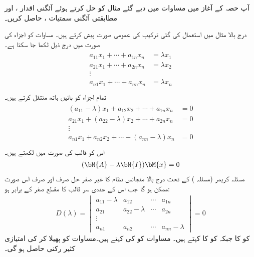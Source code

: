 آپ حصہ  کے آغاز میں مساوات  میں دیے گئے مثال کو حل کرتے ہوئے  آئگنی اقدار ،  اور  مطابقتی آئگنی سمتیات ،  حاصل کریں۔

درج بالا مثال میں استعمال کی گئی ترکیب کی عمومی صورت پیش کرتے ہیں۔ مساوات  کو اجزاء کی صورت میں درج ذیل لکھا جا سکتا ہے۔
\begin{gather}
\begin{aligned}\label{مساوات_آئگنی_متجانس_نظام_الف}
a_{11}x_1+\cdots +a_{1n}x_n&=\lambda x_1\\
a_{21}x_1+\cdots +a_{2n}x_n&=\lambda x_2\\
\vdots&\\
a_{n1}x_1+\cdots +a_{nn}x_n&=\lambda x_n\\
\end{aligned}
\end{gather}
تمام اجزاء کو بائیں ہاتھ منتقل کرتے ہیں۔
\begin{gather}
\begin{aligned}\label{مساوات_آئگنی_متجانس_نظام_ب}
(a_{11}-\lambda)x_1+a_{12}x_2+\cdots +a_{1n}x_n&=0\\
a_{21}x_1+(a_{22}-\lambda)x_2+\cdots +a_{2n}x_n&=0\\
\vdots&\\
a_{n1}x_1+a_{n2}x_2+\cdots +(a_{nn}-\lambda)x_n&=0\\
\end{aligned}
\end{gather}
اس کو قالب کی صورت میں لکھتے ہیں۔
\begin{align}\label{مساوات_آئگنی_متجانس_نظام_پ}
(\bM{A}-\lambda \bM{I})\bM{x}=0
\end{align}
مسئلہ کریمر (مسئلہ ) کے تحت درج بالا متجانس نظام کا غیر صفر حل صرف اور صرف اس صورت ممکن ہو گا جب  اس کے عددی سر قالب کا مقطع صفر کے برابر ہو:
\begin{align}\label{مساوات_آئگنی_متجانس_نظام_ت}
D(\lambda)=\begin{vmatrix} a_{11}-\lambda & a_{12}&\cdots & a_{1n} \\ a_{21}& a_{22}-\lambda&\cdots & a_{2n}\\ \vdots \\ a_{n1}& a_{n2}&\cdots & a_{nn}-\lambda \end{vmatrix}=0
\end{align} 
 کو  کا   جبکہ   کو  کا  کہتے ہیں۔ مساوات  کو  کی  کہتے ہیں۔مساوات  کو پھیلا کر  کی امتیازی کثیر رکنی حاصل ہو گی۔

